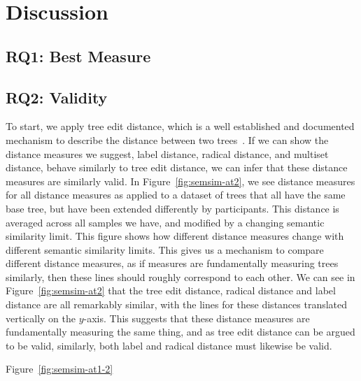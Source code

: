 \section{Discussion}
\label{sec:dicsussion}


\subsection{RQ1: Best Measure}

\subsection{RQ2: Validity}

To start, we apply tree edit distance, which is a well established and documented mechanism to describe the distance between two trees~\cite{Zhang_Shasha_1989,zhang_editing_1992,akutsu_tree_2021,pawlik_rted_2011,mcvicar_sumoted_2016}. If we can show the distance measures we suggest, label distance, radical distance, and multiset distance, behave similarly to tree edit distance, we can infer that these distance measures are similarly valid. In Figure~\ref{fig:semsim-at2}, we see distance measures for all distance measures as applied to a dataset of trees that all have the same base tree, but have been extended differently by participants. This distance is averaged across all samples we have, and modified by a changing semantic similarity limit. This figure shows how different distance measures change with different semantic similarity limits. This gives us a mechanism to compare different distance measures, as if measures are fundamentally measuring trees similarly, then these lines should roughly correspond to each other. We can see in Figure~\ref{fig:semsim-at2} that the tree edit distance, radical distance and label distance are all remarkably similar, with the lines for these distances translated vertically on the $y$-axis. This suggests that these distance measures are fundamentally measuring the same thing, and as tree edit distance can be argued to be valid, similarly, both label and radical distance must likewise be valid.

Figure~\ref{fig:semsim-at1-2}

